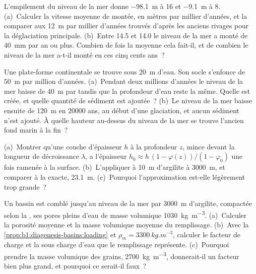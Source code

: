 \begin{exercise}[$\star\star$]\label{exo:b1:diagenesis-basins:8}
L'empilement du niveau de la mer donne \qty{-98.1}{m} à \qty{16}{\ka} et \qty{-9.1}{m} à
\qty{8}{\ka}. (a)~Calculer la vitesse moyenne de montée, en mètres par millier d'années,
et la comparer aux \qty{12}{m} par millier d'années trouvés d'après les anciens
rivages pour la déglaciation principale. (b)~Entre \qty{14.5}{\ka} et
\qty{14.0}{\ka} le niveau de la mer a monté de \qty{40}{mm} par an ou plus. Combien de fois
la moyenne cela fait-il, et de combien le niveau de la mer a-t-il monté en ces cinq cents
ans~?
\end{exercise}

\begin{exercise}[$\star\star$]\label{exo:b1:diagenesis-basins:9}
Une plate-forme continentale se trouve sous \qty{20}{m} d'eau. Son socle s'enfonce de
\qty{50}{m} par million d'années. (a)~Pendant deux millions d'années le niveau de la mer baisse de
\qty{40}{m} par  tandis que la profondeur d'eau reste la même. Quelle
 est créée, et quelle quantité de sédiment est ajoutée~? (b)~Le niveau de la mer
baisse ensuite de \qty{120}{m} en \num{20000} ans, au début d'une glaciation, et aucun
sédiment n'est ajouté. À quelle hauteur au-dessus du niveau de la mer se trouve l'ancien fond marin
à la fin~?
\end{exercise}

\begin{exercise}[$\star\star\star$]\label{exo:b1:diagenesis-basins:10}
(a)~Montrer qu'une couche d'épaisseur $h$ à la profondeur $z$, mince devant la
longueur de décroissance $\lambda$, a l'épaisseur $h_0 \approx h\,(1 - \varphi(z))/(1 -
\varphi_0)$ une fois ramenée à la surface. (b)~L'appliquer à \qty{10}{m} d'argilite
à \qty{3000}{m}, et comparer à la  exacte, \qty{23.1}{m}.
(c)~Pourquoi l'approximation est-elle légèrement trop grande~?
\end{exercise}

\begin{exercise}[$\star\star\star$]\label{exo:b1:diagenesis-basins:11}
Un bassin est comblé jusqu'au niveau de la mer par \qty{3000}{m} d'argilite, compactée selon la , ses pores pleins d'eau de masse volumique \qty{1030}{kg.m^{-3}}. (a)~Calculer la
porosité moyenne et la masse volumique moyenne du remplissage. (b)~Avec la
\cref{prop:b1:diagenesis-basins:loading} et $\rho_m =
\qty{3300}{kg.m^{-3}}$, calculer le facteur de charge et la
 sous charge d'eau que le remplissage représente. (c)~Pourquoi prendre la masse volumique des
grains, \qty{2700}{kg.m^{-3}}, donnerait-il un facteur bien plus grand, et pourquoi ce serait-il
faux~?
\end{exercise}

